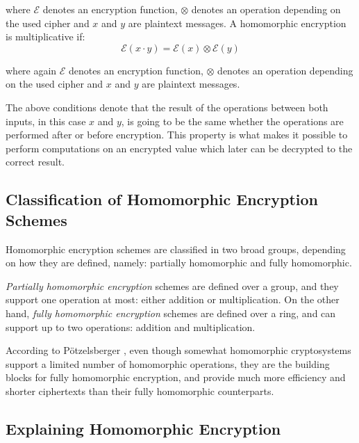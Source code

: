where $\mathcal{E}$ denotes an encryption function, $\otimes$ denotes an operation depending on the used cipher and $x$ and $y$ are plaintext messages. A homomorphic encryption is multiplicative if:
\begin{equation}
\mathcal{E}(x \cdot y) = \mathcal{E}(x) \otimes \mathcal{E}(y)
\end{equation}

where again $\mathcal{E}$ denotes an encryption function, $\otimes$ denotes an operation depending on the used cipher and $x$ and $y$ are plaintext messages.

The above conditions denote that the result of the operations between both inputs, in this case $x$ and $y$, is going to be the same whether the operations are performed after or before encryption. This property is what makes it possible to perform computations on an encrypted value which later can be decrypted to the correct result.

\subsection{Classification of Homomorphic Encryption Schemes}

Homomorphic encryption schemes are classified in two broad groups, depending on how they are defined, namely: partially homomorphic and fully homomorphic. 

\emph{Partially homomorphic encryption} schemes are defined over a group, and they support one operation at most: either addition or multiplication. On the other hand, \emph{fully homomorphic encryption} schemes are defined over a ring, and can support up to two operations: addition and multiplication.

According to P{\"o}tzelsberger \cite{potzelsberger2013kv}, even though somewhat homomorphic cryptosystems support a limited number of homomorphic operations, they are the building blocks for fully homomorphic encryption, and provide much more efficiency and shorter ciphertexts than their fully homomorphic counterparts. 


\subsection{Explaining Homomorphic Encryption}


